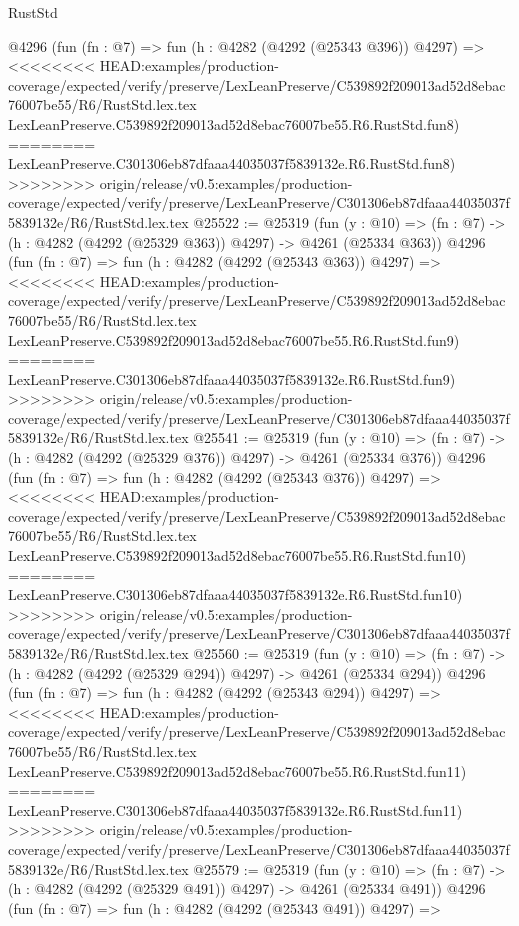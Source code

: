 \begin{lexlean}{RustStd}
\begin{coremodule}
{\begin{coremodule}
{{{{{{{{{{{{{{{{{{{{{{{{{{{{{{{{{{{    @4296
    (fun (fn : @7) =>
    fun (h : @4282 (@4292 (@25343 @396)) @4297) =>
<<<<<<<< HEAD:examples/production-coverage/expected/verify/preserve/LexLeanPreserve/C539892f209013ad52d8ebac76007be55/R6/RustStd.lex.tex
    LexLeanPreserve.C539892f209013ad52d8ebac76007be55.R6.RustStd.fun8)
========
    LexLeanPreserve.C301306eb87dfaaa44035037f5839132e.R6.RustStd.fun8)
>>>>>>>> origin/release/v0.5:examples/production-coverage/expected/verify/preserve/LexLeanPreserve/C301306eb87dfaaa44035037f5839132e/R6/RustStd.lex.tex
@25522 := @25319
    (fun (y : @10) => (fn : @7) -> (h : @4282 (@4292 (@25329 @363)) @4297) -> @4261 (@25334 @363))
    @4296
    (fun (fn : @7) =>
    fun (h : @4282 (@4292 (@25343 @363)) @4297) =>
<<<<<<<< HEAD:examples/production-coverage/expected/verify/preserve/LexLeanPreserve/C539892f209013ad52d8ebac76007be55/R6/RustStd.lex.tex
    LexLeanPreserve.C539892f209013ad52d8ebac76007be55.R6.RustStd.fun9)
========
    LexLeanPreserve.C301306eb87dfaaa44035037f5839132e.R6.RustStd.fun9)
>>>>>>>> origin/release/v0.5:examples/production-coverage/expected/verify/preserve/LexLeanPreserve/C301306eb87dfaaa44035037f5839132e/R6/RustStd.lex.tex
@25541 := @25319
    (fun (y : @10) => (fn : @7) -> (h : @4282 (@4292 (@25329 @376)) @4297) -> @4261 (@25334 @376))
    @4296
    (fun (fn : @7) =>
    fun (h : @4282 (@4292 (@25343 @376)) @4297) =>
<<<<<<<< HEAD:examples/production-coverage/expected/verify/preserve/LexLeanPreserve/C539892f209013ad52d8ebac76007be55/R6/RustStd.lex.tex
    LexLeanPreserve.C539892f209013ad52d8ebac76007be55.R6.RustStd.fun10)
========
    LexLeanPreserve.C301306eb87dfaaa44035037f5839132e.R6.RustStd.fun10)
>>>>>>>> origin/release/v0.5:examples/production-coverage/expected/verify/preserve/LexLeanPreserve/C301306eb87dfaaa44035037f5839132e/R6/RustStd.lex.tex
@25560 := @25319
    (fun (y : @10) => (fn : @7) -> (h : @4282 (@4292 (@25329 @294)) @4297) -> @4261 (@25334 @294))
    @4296
    (fun (fn : @7) =>
    fun (h : @4282 (@4292 (@25343 @294)) @4297) =>
<<<<<<<< HEAD:examples/production-coverage/expected/verify/preserve/LexLeanPreserve/C539892f209013ad52d8ebac76007be55/R6/RustStd.lex.tex
    LexLeanPreserve.C539892f209013ad52d8ebac76007be55.R6.RustStd.fun11)
========
    LexLeanPreserve.C301306eb87dfaaa44035037f5839132e.R6.RustStd.fun11)
>>>>>>>> origin/release/v0.5:examples/production-coverage/expected/verify/preserve/LexLeanPreserve/C301306eb87dfaaa44035037f5839132e/R6/RustStd.lex.tex
@25579 := @25319
    (fun (y : @10) => (fn : @7) -> (h : @4282 (@4292 (@25329 @491)) @4297) -> @4261 (@25334 @491))
    @4296
    (fun (fn : @7) =>
    fun (h : @4282 (@4292 (@25343 @491)) @4297) =>
}}}}}}}}}}}}}}}}}}}}}}}}}}}}}}}}}}}
\end{coremodule}}
\end{coremodule}
\end{lexlean}

